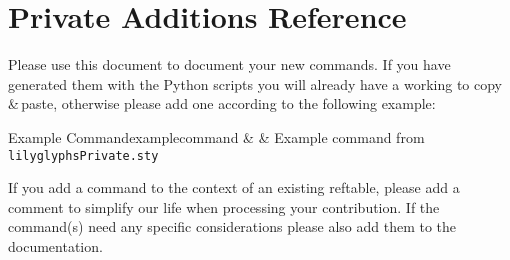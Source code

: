 \documentclass{article}
\begin{document}
\section*{\lilyglyphs{} Private Additions Reference}
Please use this document to document your new commands.
If you have generated them with the Python scripts you will already have a working  to copy\,\&\,paste, otherwise please add one according to the following example:

\begin{reftable}{Example Command}{examplecommand}
\lilyExampleCommand &  & Example command from \texttt{lilyglyphsPrivate.sty}\\
\end{reftable}

If you add a command to the context of an existing reftable, please add a comment to simplify our life when processing your contribution.
If the command(s) need any specific considerations please also add them to the documentation.
\end{document}
